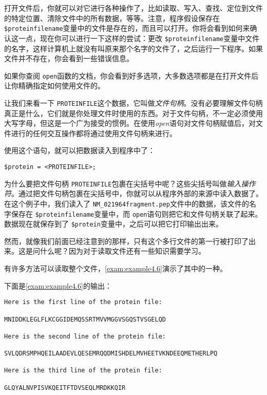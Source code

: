 打开文件后，你就可以对它进行各种操作了，比如读取、写入、查找、定位到文件的特定位置、清除文件中的所有数据，等等。注意，程序假设保存在 \verb|$proteinfilename|变量中的文件是存在的，而且可以打开。你将会看到如何来确认这一点，现在你可以进行一下这样的尝试：更改 \verb|$proteinfilename|变量中文件的名字，这样计算机上就没有叫原来那个名字的文件了，之后运行一下程序。如果文件并不存在，你会看到一些错误信息。

如果你查阅 \verb|open|函数的文档，你会看到好多选项，大多数选项都是在打开文件后让你精确指定如何使用文件的。

让我们来看一下 \verb|PROTEINFILE|这个数据，它叫做\textit{文件句柄}。没有必要理解文件句柄真正是什么，它们就是你处理文件时使用的东西。对于文件句柄，不一定必须使用大写字母，但这是一个广为接受的惯例。在使用\textit{open}语句对文件句柄赋值后，对文件进行的任何交互操作都将通过使用文件句柄来进行。

使用这个语句，就可以把数据读入到程序中了：

\begin{lstlisting}
$protein = <PROTEINFILE>;
\end{lstlisting}

为什么要把文件句柄 \verb|PROTEINFILE|包裹在尖括号中呢？这些尖括号叫做\textit{输入操作符}。通过把文件句柄包裹在尖括号中，你就可以从程序外部的来源中读入数据了。在这个例子中，我们读入了 \verb|NM_021964fragment.pep|文件中的数据，该文件的名字保存在 \verb|$proteinfilename|变量中，而 \verb|open|语句则把它和文件句柄关联了起来。数据现在就保存到了 \verb|$protein|变量中，之后可以把它打印输出出来。

然而，就像我们前面已经注意到的那样，只有这个多行文件的第一行被打印了出来。这是问什么呢？因为对于读取文件还有一些知识需要学习。

有许多方法可以读取整个文件，\autoref{exam:example4.6}演示了其中的一种。



下面是\autoref{exam:example4.6}的输出：

\begin{lstlisting}
Here is the first line of the protein file:

MNIDDKLEGLFLKCGGIDEMQSSRTMVVMGGVSGQSTVSGELQD

Here is the second line of the protein file:

SVLQDRSMPHQEILAADEVLQESEMRQQDMISHDELMVHEETVKNDEEQMETHERLPQ

Here is the third line of the protein file:

GLQYALNVPISVKQEITFTDVSEQLMRDKKQIR
\end{lstlisting}

